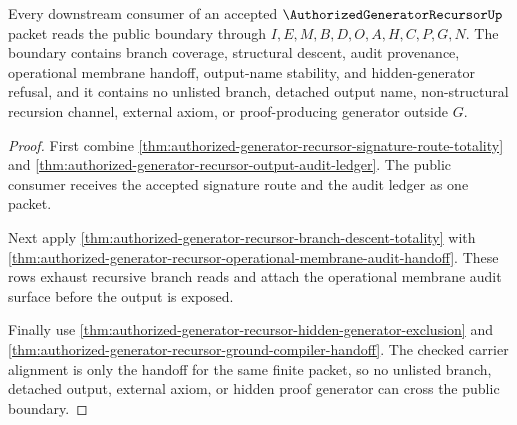\begin{theorem}
\label{thm:authorized-generator-recursor-public-consumer-boundary}
Every downstream consumer of an accepted $\AuthorizedGeneratorRecursorUp$
packet reads the public boundary through $I,E,M,B,D,O,A,H,C,P,G,N$. The boundary
contains branch coverage, structural descent, audit provenance, operational
membrane handoff, output-name stability, and hidden-generator refusal, and it
contains no unlisted branch, detached output name, non-structural recursion
channel, external axiom, or proof-producing generator outside $G$.
\end{theorem}
\begin{proof}
First combine
\autoref{thm:authorized-generator-recursor-signature-route-totality} and
\autoref{thm:authorized-generator-recursor-output-audit-ledger}. The public
consumer receives the accepted signature route and the audit ledger as one
packet.

Next apply \autoref{thm:authorized-generator-recursor-branch-descent-totality}
with \autoref{thm:authorized-generator-recursor-operational-membrane-audit-handoff}.
These rows exhaust recursive branch reads and attach the operational membrane
audit surface before the output is exposed.

Finally use \autoref{thm:authorized-generator-recursor-hidden-generator-exclusion}
and \autoref{thm:authorized-generator-recursor-ground-compiler-handoff}. The
checked carrier alignment is only the handoff for the same finite packet, so no
unlisted branch, detached output, external axiom, or hidden proof generator can
cross the public boundary.
\end{proof}

